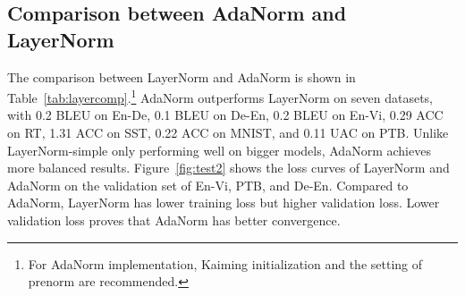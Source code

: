 \documentclass{article}
\begin{document}
  





 
\begin{table}[h]
\small
\setlength{\tabcolsep}{3pt}
\centering
  \caption{Results of LayerNorm and AdaNorm. ``(+)'' means higher is better. ``(-)'' means lower is better.  AdaNorm outperforms LayerNorm on  seven datasets.  }
  \label{tab:layercomp}
  \end{table}
  
  
  
\subsection{Comparison between AdaNorm and LayerNorm }
The comparison between LayerNorm and AdaNorm is shown in Table~\ref{tab:layercomp}.\footnote{For AdaNorm implementation, Kaiming initialization  and the setting of prenorm are recommended. } AdaNorm outperforms LayerNorm on seven datasets, with 0.2 BLEU on En-De, 0.1 BLEU on De-En, 0.2 BLEU on En-Vi, 0.29 ACC on RT, 1.31 ACC on SST, 0.22 ACC on MNIST, and 0.11 UAC on PTB. Unlike LayerNorm-simple only performing well on bigger models, AdaNorm achieves more balanced results. Figure~\ref{fig:test2} shows the loss curves of LayerNorm and AdaNorm on the validation set of En-Vi, PTB, and De-En. Compared to AdaNorm, LayerNorm has lower training loss but higher validation loss. Lower validation loss proves that AdaNorm  has better convergence.
\end{document}
